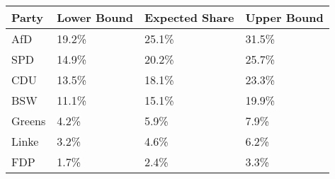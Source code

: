 \begin{tabular}{llll}
  \hline
Party & Lower Bound & Expected Share & Upper Bound \\ 
  \hline
AfD & 19.2\% & 25.1\% & 31.5\% \\ 
  SPD & 14.9\% & 20.2\% & 25.7\% \\ 
  CDU & 13.5\% & 18.1\% & 23.3\% \\ 
  BSW & 11.1\% & 15.1\% & 19.9\% \\ 
  Greens & 4.2\% & 5.9\% & 7.9\% \\ 
  Linke & 3.2\% & 4.6\% & 6.2\% \\ 
  FDP & 1.7\% & 2.4\% & 3.3\% \\ 
   \hline
\end{tabular}
